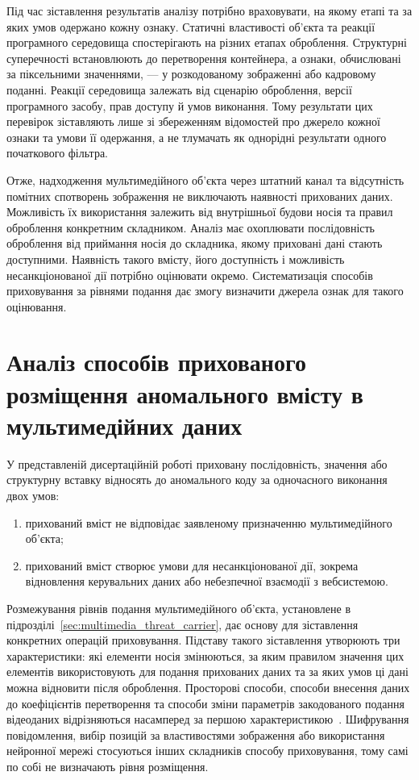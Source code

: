 Під час зіставлення результатів аналізу потрібно враховувати, на якому етапі та за яких умов одержано кожну ознаку. Статичні властивості об’єкта та реакції програмного середовища спостерігають на різних етапах оброблення. Структурні суперечності встановлюють до перетворення контейнера, а ознаки, обчислювані за піксельними значеннями, --- у розкодованому зображенні або кадровому поданні. Реакції середовища залежать від сценарію оброблення, версії програмного засобу, прав доступу й умов виконання. Тому результати цих перевірок зіставляють лише зі збереженням відомостей про джерело кожної ознаки та умови її одержання, а не тлумачать як однорідні результати одного початкового фільтра.

Отже, надходження мультимедійного об’єкта через штатний канал та відсутність помітних спотворень зображення не виключають наявності прихованих даних. Можливість їх використання залежить від внутрішньої будови носія та правил оброблення конкретним складником. Аналіз має охоплювати послідовність оброблення від приймання носія до складника, якому приховані дані стають доступними. Наявність такого вмісту, його доступність і можливість несанкціонованої дії потрібно оцінювати окремо. Систематизація способів приховування за рівнями подання дає змогу визначити джерела ознак для такого оцінювання.

\section{Аналіз способів прихованого розміщення аномального вмісту в мультимедійних даних}
\label{sec:hidden_code_placement}

У представленій дисертаційній роботі приховану послідовність, значення або структурну вставку відносять до аномального коду за одночасного виконання двох умов:
\begin{enumerate}[label=\arabic*),leftmargin=1.1cm,itemsep=0pt,parsep=0pt]
\item прихований вміст не відповідає заявленому призначенню мультимедійного об’єкта;
\item прихований вміст створює умови для несанкціонованої дії, зокрема відновлення керувальних даних або небезпечної взаємодії з вебсистемою.
\end{enumerate}

Розмежування рівнів подання мультимедійного об’єкта, установлене в підрозділі~\ref{sec:multimedia_threat_carrier}, дає основу для зіставлення конкретних операцій приховування. Підставу такого зіставлення утворюють три характеристики: які елементи носія змінюються, за яким правилом значення цих елементів використовують для подання прихованих даних та за яких умов ці дані можна відновити після оброблення. Просторові способи, способи внесення даних до коефіцієнтів перетворення та способи зміни параметрів закодованого подання відеоданих відрізняються насамперед за першою характеристикою~\cite{muralidharan2022race,bouzegza2022video}. Шифрування повідомлення, вибір позицій за властивостями зображення або використання нейронної мережі стосуються інших складників способу приховування, тому самі по собі не визначають рівня розміщення.

